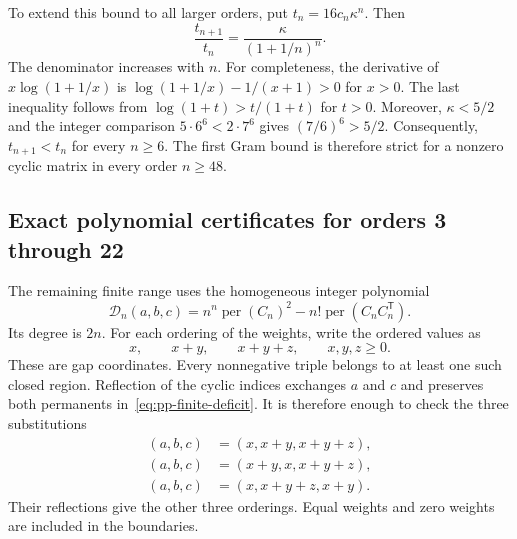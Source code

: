 \documentclass[11pt,a4paper]{article}
\theoremstyle{definition}
\theoremstyle{remark}
\newcommand{\per}{\operatorname{per}}
\newcommand{\T}{\mathsf{T}}
\begin{document}
To extend this bound to all larger orders, put $t_n=16c_n\kappa^n$.
Then
\[
\frac{t_{n+1}}{t_n}=\frac{\kappa}{(1+1/n)^n}.
\]
The denominator increases with $n$.
For completeness, the derivative of $x\log(1+1/x)$ is
$\log(1+1/x)-1/(x+1)>0$ for $x>0$.
The last inequality follows from $\log(1+t)>t/(1+t)$ for $t>0$.
Moreover, $\kappa<5/2$ and the integer comparison
$5\cdot6^6<2\cdot7^6$ gives $(7/6)^6>5/2$.
Consequently, $t_{n+1}<t_n$ for every $n\ge6$.
The first Gram bound is therefore strict for a nonzero cyclic matrix in every order $n\ge48$.

\subsection{Exact polynomial certificates for orders 3 through 22}

The remaining finite range uses the homogeneous integer polynomial
\begin{equation}\label{eq:pp-finite-deficit}
\mathcal D_n(a,b,c)
=n^n\per(C_n)^2-n!\per(C_nC_n^\T).
\end{equation}
Its degree is $2n$.
For each ordering of the weights, write the ordered values as
\[
x,\qquad x+y,\qquad x+y+z,
\qquad x,y,z\ge0.
\]
These are gap coordinates.
Every nonnegative triple belongs to at least one such closed region.
Reflection of the cyclic indices exchanges $a$ and $c$ and preserves both permanents in~\eqref{eq:pp-finite-deficit}.
It is therefore enough to check the three substitutions
\begin{equation}\label{eq:pp-chambers}
\begin{aligned}
(a,b,c)&=(x,x+y,x+y+z),\\
(a,b,c)&=(x+y,x,x+y+z),\\
(a,b,c)&=(x,x+y+z,x+y).
\end{aligned}
\end{equation}
Their reflections give the other three orderings.
Equal weights and zero weights are included in the boundaries.
\end{document}
